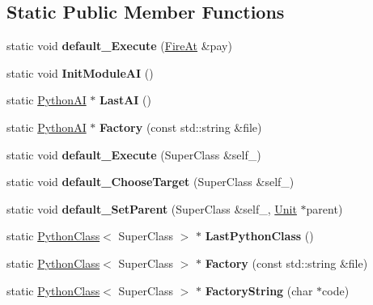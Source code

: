 \subsection*{Static Public Member Functions}
\begin{DoxyCompactItemize}
\item 
static void {\bfseries default\+\_\+\+Execute} (\hyperlink{classOrders_1_1FireAt}{Fire\+At} \&pay)\hypertarget{classPythonAI_a5ac9661b644fff2223233f1d91a11e15}{}\label{classPythonAI_a5ac9661b644fff2223233f1d91a11e15}

\item 
static void {\bfseries Init\+Module\+AI} ()\hypertarget{classPythonAI_a54db0353eda4f773cbfde1be343948ad}{}\label{classPythonAI_a54db0353eda4f773cbfde1be343948ad}

\item 
static \hyperlink{classPythonAI}{Python\+AI} $\ast$ {\bfseries Last\+AI} ()\hypertarget{classPythonAI_ad0b05f2ebbed45f1cbdae228c09dd9d4}{}\label{classPythonAI_ad0b05f2ebbed45f1cbdae228c09dd9d4}

\item 
static \hyperlink{classPythonAI}{Python\+AI} $\ast$ {\bfseries Factory} (const std\+::string \&file)\hypertarget{classPythonAI_aa05e941a2ab218b6865616dcd9e6f5d0}{}\label{classPythonAI_aa05e941a2ab218b6865616dcd9e6f5d0}

\item 
static void {\bfseries default\+\_\+\+Execute} (Super\+Class \&self\+\_\+)\hypertarget{classPythonAI_a860543305468838d2eac0def15547a52}{}\label{classPythonAI_a860543305468838d2eac0def15547a52}

\item 
static void {\bfseries default\+\_\+\+Choose\+Target} (Super\+Class \&self\+\_\+)\hypertarget{classPythonAI_a4b5678a5e992a4756859e0c6e85486ea}{}\label{classPythonAI_a4b5678a5e992a4756859e0c6e85486ea}

\item 
static void {\bfseries default\+\_\+\+Set\+Parent} (Super\+Class \&self\+\_\+, \hyperlink{classUnit}{Unit} $\ast$parent)\hypertarget{classPythonAI_a581b69a01eb7541bd84e83915076f54d}{}\label{classPythonAI_a581b69a01eb7541bd84e83915076f54d}

\item 
static \hyperlink{classPythonClass}{Python\+Class}$<$ Super\+Class $>$ $\ast$ {\bfseries Last\+Python\+Class} ()\hypertarget{classPythonAI_aa9d11c466ae79e194c0629a9c07850e1}{}\label{classPythonAI_aa9d11c466ae79e194c0629a9c07850e1}

\item 
static \hyperlink{classPythonClass}{Python\+Class}$<$ Super\+Class $>$ $\ast$ {\bfseries Factory} (const std\+::string \&file)\hypertarget{classPythonAI_af3d915e5f7e32f730c6c4f18037fc571}{}\label{classPythonAI_af3d915e5f7e32f730c6c4f18037fc571}

\item 
static \hyperlink{classPythonClass}{Python\+Class}$<$ Super\+Class $>$ $\ast$ {\bfseries Factory\+String} (char $\ast$code)\hypertarget{classPythonAI_a1c3c3e3fe1a0a2987bc64be5387443c0}{}\label{classPythonAI_a1c3c3e3fe1a0a2987bc64be5387443c0}

\end{DoxyCompactItemize}
